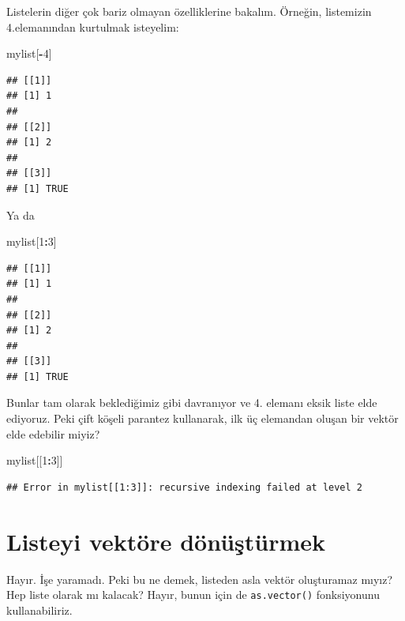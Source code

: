 \documentclass[
]{book}
\newenvironment{Shaded}{\begin{snugshade}}{\end{snugshade}}
\newcommand{\DecValTok}[1]{\textcolor[rgb]{0.00,0.00,0.81}{#1}}
\newcommand{\NormalTok}[1]{#1}
\newcommand{\OperatorTok}[1]{\textcolor[rgb]{0.81,0.36,0.00}{\textbf{#1}}}
\begin{document}
Listelerin diğer çok bariz olmayan özelliklerine bakalım. Örneğin, listemizin 4.elemanından kurtulmak isteyelim:

\begin{Shaded}
\begin{Highlighting}[]
\NormalTok{mylist[}\OperatorTok{{-}}\DecValTok{4}\NormalTok{]}
\end{Highlighting}
\end{Shaded}

\begin{verbatim}
## [[1]]
## [1] 1
## 
## [[2]]
## [1] 2
## 
## [[3]]
## [1] TRUE
\end{verbatim}

Ya da

\begin{Shaded}
\begin{Highlighting}[]
\NormalTok{mylist[}\DecValTok{1}\OperatorTok{:}\DecValTok{3}\NormalTok{]}
\end{Highlighting}
\end{Shaded}

\begin{verbatim}
## [[1]]
## [1] 1
## 
## [[2]]
## [1] 2
## 
## [[3]]
## [1] TRUE
\end{verbatim}

Bunlar tam olarak beklediğimiz gibi davranıyor ve 4. elemanı eksik liste elde ediyoruz. Peki çift köşeli parantez kullanarak, ilk üç elemandan oluşan bir vektör elde edebilir miyiz?

\begin{Shaded}
\begin{Highlighting}[]
\NormalTok{mylist[[}\DecValTok{1}\OperatorTok{:}\DecValTok{3}\NormalTok{]]}
\end{Highlighting}
\end{Shaded}

\begin{verbatim}
## Error in mylist[[1:3]]: recursive indexing failed at level 2
\end{verbatim}

\hypertarget{listeyi-vektuxf6re-duxf6nuxfcux15ftuxfcrmek}{%
\section{Listeyi vektöre dönüştürmek}\label{listeyi-vektuxf6re-duxf6nuxfcux15ftuxfcrmek}}

Hayır. İşe yaramadı. Peki bu ne demek, listeden asla vektör oluşturamaz mıyız? Hep liste olarak mı kalacak? Hayır, bunun için de \texttt{as.vector()} fonksiyonunu kullanabiliriz.
\end{document}
